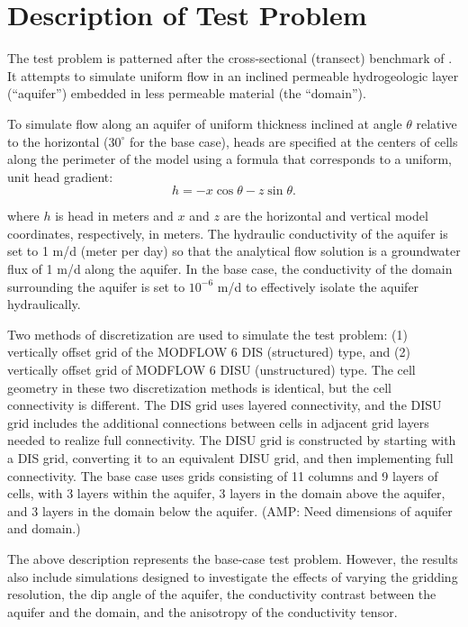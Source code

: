 \documentclass{article}
\begin{document}
\section{Description of Test Problem}

The test problem is patterned after the cross-sectional (transect) benchmark of \cite{bardot2022}. It attempts to simulate uniform flow in an inclined permeable hydrogeologic layer (``aquifer'') embedded in less permeable material (the ``domain'').

To simulate flow along an aquifer of uniform thickness inclined at angle $\theta$ relative to the horizontal ($30^{\circ}$ for the base case), heads are specified at the centers of cells along the perimeter of the model using a formula that corresponds to a uniform, unit head gradient:
\begin{equation}
\label{eqn:head_analyt_along}
h = - x \cos \theta - z \sin \theta.
\end{equation}

\noindent where $h$ is head in meters and $x$ and $z$ are the horizontal and vertical model coordinates, respectively, in meters. The hydraulic conductivity of the aquifer is set to 1 m/d (meter per day) so that the analytical flow solution is a groundwater flux of 1 m/d along the aquifer. In the base case, the conductivity of the domain surrounding the aquifer is set to $10^{-6}$ m/d to effectively isolate the aquifer hydraulically.

Two methods of discretization are used to simulate the test problem: (1) vertically offset grid of the MODFLOW 6 DIS (structured) type, and (2) vertically offset grid of MODFLOW 6 DISU (unstructured) type. The cell geometry in these two discretization methods is identical, but the cell connectivity is different. The DIS grid uses layered connectivity, and the DISU grid includes the additional connections between cells in adjacent grid layers needed to realize full connectivity. The DISU grid is constructed by starting with a DIS grid, converting it to an equivalent DISU grid, and then implementing full connectivity. The base case uses grids consisting of 11 columns and 9 layers of cells, with 3 layers within the aquifer, 3 layers in the domain above the aquifer, and 3 layers in the domain below the aquifer. {\color{red} (AMP: Need dimensions of aquifer and domain.)}

The above description represents the base-case test problem. However, the results also include simulations designed to investigate the effects of varying the gridding resolution, the dip angle of the aquifer, the conductivity contrast between the aquifer and the domain, and the anisotropy of the conductivity tensor.
\end{document}
